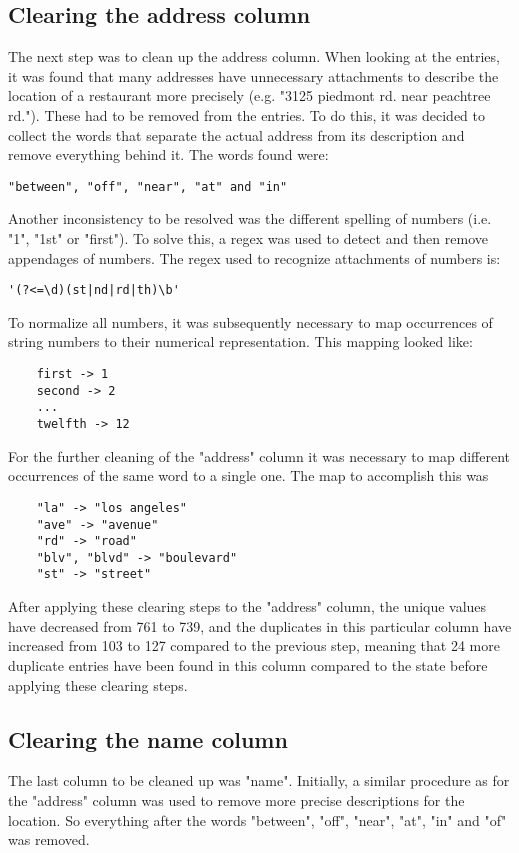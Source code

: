 \documentclass[conference]{IEEEtran}
\begin{document}
\subsection{Clearing the address column}
The next step was to clean up the address column. When looking at the entries, it was found that many addresses have unnecessary attachments to describe the location of a restaurant more precisely (e.g. "3125 piedmont rd. near peachtree rd."). These had to be removed from the entries. To do this, it was decided to collect the words that separate the actual address from its description and remove everything behind it. The words found were: 
\begin{lstlisting}
"between", "off", "near", "at" and "in"
\end{lstlisting}
Another inconsistency to be resolved was the different spelling of numbers (i.e. "1", "1st" or "first"). To solve this, a regex was used to detect and then remove appendages of numbers. The regex used to recognize attachments of numbers is: 
\begin{lstlisting}
'(?<=\d)(st|nd|rd|th)\b'
\end{lstlisting}
To normalize all numbers, it was subsequently necessary to map occurrences of string numbers to their numerical representation. This mapping looked like: 
\begin{lstlisting}
	first -> 1
	second -> 2
	...
	twelfth -> 12
\end{lstlisting} 
For the further cleaning of the "address" column it was necessary to map different occurrences of the same word to a single one. The map to accomplish this was 
\begin{lstlisting}
	"la" -> "los angeles" 
	"ave" -> "avenue"
	"rd" -> "road"
	"blv", "blvd" -> "boulevard" 
	"st" -> "street"
\end{lstlisting} 
After applying these clearing steps to the "address" column, the unique values have decreased from 761 to 739, and the duplicates in this particular column have increased from 103 to 127 compared to the previous step, meaning that 24 more duplicate entries have been found in this column compared to the state before applying these clearing steps.
\subsection{Clearing the name column}
The last column to be cleaned up was "name". Initially, a similar procedure as for the "address" column was used to remove more precise descriptions for the location. So everything after the words "between", "off", "near", "at", "in" and "of" was removed.
\end{document}
